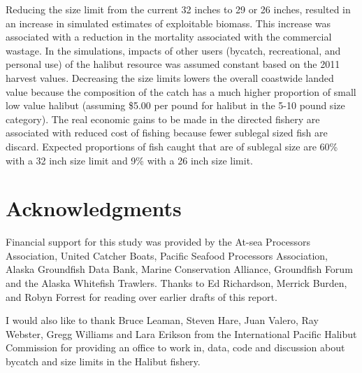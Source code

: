 Reducing the size limit from the current 32 inches to 29 or 26 inches, resulted in an increase in simulated estimates of exploitable biomass.  This increase was associated with a reduction in the mortality associated with the commercial wastage.  In the simulations, impacts of other users (bycatch, recreational, and personal use) of the halibut resource was assumed  constant based on the 2011 harvest values.  Decreasing the size limits lowers the overall coastwide landed value because the composition of the catch has a much higher proportion of small low value halibut (assuming \$5.00 per pound for halibut in the 5-10 pound size category).  The real economic gains to be made in the directed fishery are associated with reduced cost of fishing because fewer sublegal sized fish are discard.  Expected proportions of fish caught that are of sublegal size are 60\% with a 32 inch size limit and 9\% with a 26 inch size limit.


\section*{Acknowledgments} %
\label{sec:acknowledgments}

Financial support for this study was provided by the At-sea Processors Association, United Catcher Boats, Pacific Seafood Processors Association, Alaska Groundfish Data Bank, Marine Conservation Alliance, Groundfish Forum and the Alaska Whitefish Trawlers. Thanks to Ed Richardson, Merrick Burden, and Robyn Forrest for reading over earlier drafts of this report.

I would also like to thank Bruce Leaman, Steven Hare, Juan Valero, Ray Webster, Gregg Williams and Lara Erikson from the International Pacific Halibut Commission for providing an office to work in, data, code and discussion about bycatch and size limits in the Halibut fishery.  


